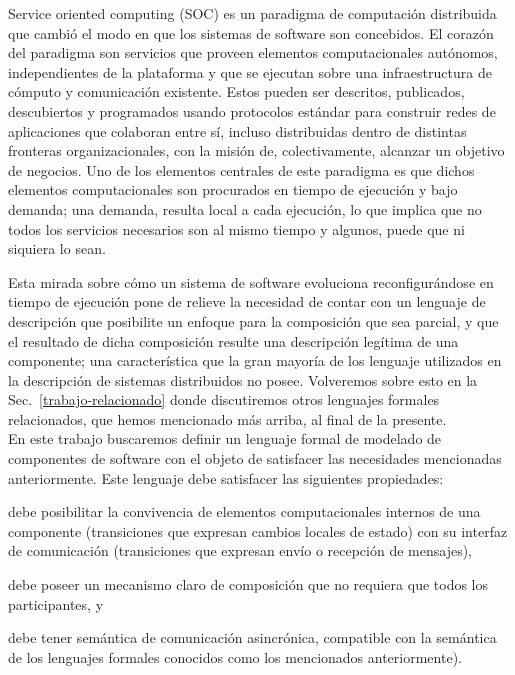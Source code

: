 Service oriented computing (SOC) es un paradigma de computación distribuida que cambió el modo en que los sistemas de software son concebidos. El corazón del paradigma son servicios que proveen elementos computacionales autónomos, independientes de la plataforma y que se ejecutan sobre una infraestructura de cómputo y comunicación existente. Estos pueden ser descritos, publicados, descubiertos y programados usando protocolos estándar para construir redes de aplicaciones que colaboran entre sí, incluso distribuidas dentro de distintas fronteras organizacionales, con la misión de, colectivamente, alcanzar un objetivo de negocios. Uno de los elementos centrales de este paradigma es que dichos elementos computacionales son procurados en tiempo de ejecución y bajo demanda; una demanda, resulta local a cada ejecución, lo que implica que no todos los servicios necesarios son al mismo tiempo y algunos, puede que ni siquiera lo sean.

Esta mirada sobre cómo un sistema de software evoluciona reconfigurándose en tiempo de ejecución pone de relieve la necesidad de contar con un lenguaje de descripción que posibilite un enfoque para la composición que sea parcial, y que el resultado de dicha composición resulte una descripción legítima de una componente; una característica que la gran mayoría de los lenguaje utilizados en la descripción de sistemas distribuidos no posee. Volveremos sobre esto en la Sec.~\ref{trabajo-relacionado} donde discutiremos otros lenguajes formales relacionados, que hemos mencionado más arriba, al final de la presente.\\

En este trabajo buscaremos definir un lenguaje formal de modelado de componentes de software con el objeto de satisfacer las necesidades mencionadas anteriormente. Este lenguaje debe satisfacer las siguientes propiedades:
\begin{inparaenum}[1.]
\item debe posibilitar la convivencia de elementos computacionales internos de una componente (transiciones que expresan cambios locales de estado) con su interfaz de comunicación (transiciones que expresan envío o recepción de mensajes),
\item debe poseer un mecanismo claro de composición que no requiera que todos los participantes, y
\item debe tener semántica de comunicación asincrónica, compatible con la semántica de los lenguajes formales conocidos como los mencionados anteriormente).
\end{inparaenum}


